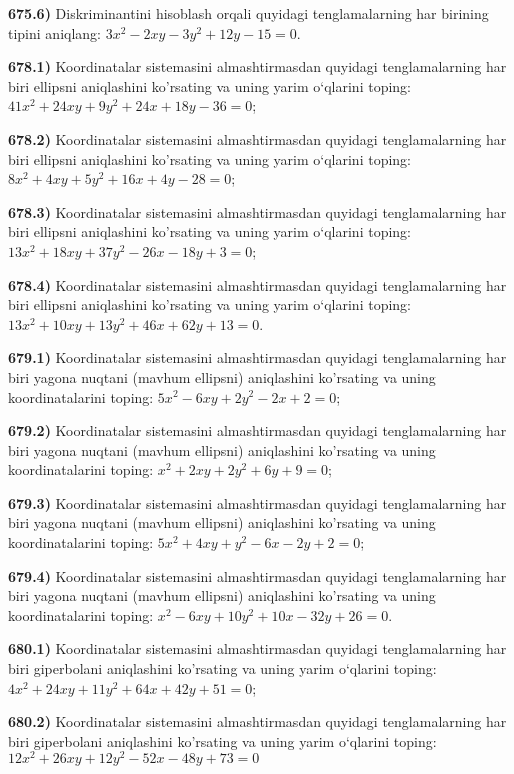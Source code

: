 \textbf{675.6)} Diskriminantini hisoblash orqali quyidagi tenglamalarning har birining tipini aniqlang: $3 x^2-2 x y-3 y^2+12 y-15=0$.

\textbf{678.1)} Koordinatalar sistemasini almashtirmasdan quyidagi tenglamalarning har biri ellipsni aniqlashini ko'rsating va uning yarim o‘qlarini toping: $41 x^2+24 x y+9 y^2+24 x+18 y-36=0$;

\textbf{678.2)} Koordinatalar sistemasini almashtirmasdan quyidagi tenglamalarning har biri ellipsni aniqlashini ko'rsating va uning yarim o‘qlarini toping: $8 x^2+4 x y+5 y^2+16 x+4 y-28=0$;

\textbf{678.3)} Koordinatalar sistemasini almashtirmasdan quyidagi tenglamalarning har biri ellipsni aniqlashini ko'rsating va uning yarim o‘qlarini toping: $13 x^2+18 x y+37 y^2-26 x-18 y+3=0$;

\textbf{678.4)} Koordinatalar sistemasini almashtirmasdan quyidagi tenglamalarning har biri ellipsni aniqlashini ko'rsating va uning yarim o‘qlarini toping: $13 x^2+10 x y+13 y^2+46 x+62 y+13=0$.

\textbf{679.1)} Koordinatalar sistemasini almashtirmasdan quyidagi tenglamalarning har biri yagona nuqtani (mavhum ellipsni) aniqlashini ko'rsating va uning koordinatalarini toping: $5 x^2-6 x y+2 y^2-2 x+2=0$;

\textbf{679.2)} Koordinatalar sistemasini almashtirmasdan quyidagi tenglamalarning har biri yagona nuqtani (mavhum ellipsni) aniqlashini ko'rsating va uning koordinatalarini toping: $x^2+2 x y+2 y^2+6 y+9=0$;

\textbf{679.3)} Koordinatalar sistemasini almashtirmasdan quyidagi tenglamalarning har biri yagona nuqtani (mavhum ellipsni) aniqlashini ko'rsating va uning koordinatalarini toping: $5 x^2+4 x y+y^2-6 x-2 y+2=0$;

\textbf{679.4)} Koordinatalar sistemasini almashtirmasdan quyidagi tenglamalarning har biri yagona nuqtani (mavhum ellipsni) aniqlashini ko'rsating va uning koordinatalarini toping: $x^2-6 x y+10 y^2+10 x-32 y+26=0$.

\textbf{680.1)} Koordinatalar sistemasini almashtirmasdan quyidagi tenglamalarning har biri giperbolani aniqlashini ko'rsating va uning yarim o‘qlarini toping: $4 x^2+24 x y+11 y^2+64 x+42 y+51=0$;

\textbf{680.2)} Koordinatalar sistemasini almashtirmasdan quyidagi tenglamalarning har biri giperbolani aniqlashini ko'rsating va uning yarim o‘qlarini toping: $12 x^2+26 x y+12 y^2-52 x-48 y+73=0$

